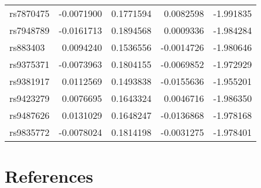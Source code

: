 \documentclass[
]{article}
\theoremstyle{plain}
\begin{document}
\begin{longtable}[t]{lrrrr}
rs7870475 & -0.0071900 & 0.1771594 & 0.0082598 & -1.991835\\
rs7948789 & -0.0161713 & 0.1894568 & 0.0009336 & -1.984284\\
rs883403 & 0.0094240 & 0.1536556 & -0.0014726 & -1.980646\\
rs9375371 & -0.0073963 & 0.1804155 & -0.0069852 & -1.972929\\
\addlinespace
rs9381917 & 0.0112569 & 0.1493838 & -0.0155636 & -1.955201\\
rs9423279 & 0.0076695 & 0.1643324 & 0.0046716 & -1.986350\\
rs9487626 & 0.0131029 & 0.1648247 & -0.0136868 & -1.978168\\
rs9835772 & -0.0078024 & 0.1814198 & -0.0031275 & -1.978401\\*
\end{longtable}

\hypertarget{references}{%
\section*{References}\label{references}}
\end{document}
